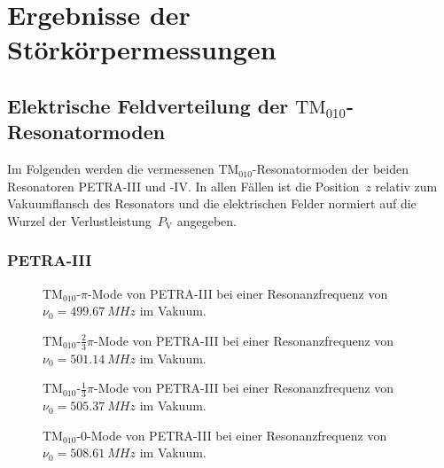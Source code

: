 \chapter{Ergebnisse der Störkörpermessungen}
\label{sec:appendix_felder}

\section{Elektrische Feldverteilung der $\mathrm{TM}_{010}$-Resonatormoden}
\label{app:tm010_felder}
Im Folgenden werden die vermessenen $\mathrm{TM}_{010}$-Resonatormoden der beiden Resonatoren PETRA-III und -IV.
In allen Fällen ist die Position~$z$ relativ zum Vakuumflansch des Resonators und die elektrischen Felder normiert auf die Wurzel der Verlustleistung~$P_\mathrm{V}$ angegeben.

\subsection{PETRA-III}
\FloatBarrier
\begin{figure}[h]
  \centering
  
  \caption{$\mathrm{TM}_{010}\text{-}\pi$-Mode von PETRA-III bei einer Resonanzfrequenz von $\nu_0 = \SI{499.67}{MHz}$ im Vakuum.}
\end{figure}

\begin{figure}[h]
  \centering
  
  \caption{$\mathrm{TM}_{010}\text{-}\frac{2}{3}\pi$-Mode von PETRA-III bei einer Resonanzfrequenz von $\nu_0 = \SI{501.14}{MHz}$ im Vakuum.}
\end{figure}

\begin{figure}[h]
  \centering
  
  \caption{$\mathrm{TM}_{010}\text{-}\frac{1}{3}\pi$-Mode von PETRA-III bei einer Resonanzfrequenz von $\nu_0 = \SI{505.37}{MHz}$ im Vakuum.}
\end{figure}

\begin{figure}[h]
  \centering
  
  \caption{$\mathrm{TM}_{010}\text{-}0$-Mode von PETRA-III bei einer Resonanzfrequenz von $\nu_0 = \SI{508.61}{MHz}$ im Vakuum.}
\end{figure}
\FloatBarrier

